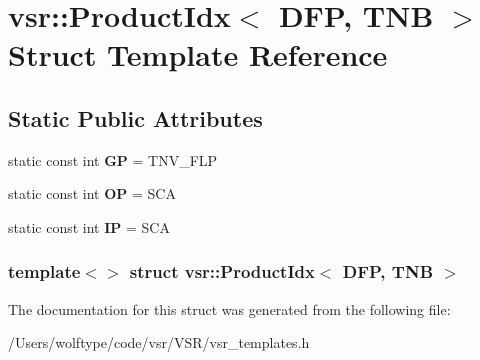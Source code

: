 \hypertarget{structvsr_1_1_product_idx_3_01_d_f_p_00_01_t_n_b_01_4}{\section{vsr\-:\-:Product\-Idx$<$ D\-F\-P, T\-N\-B $>$ Struct Template Reference}
\label{structvsr_1_1_product_idx_3_01_d_f_p_00_01_t_n_b_01_4}
}
\subsection*{Static Public Attributes}
\begin{DoxyCompactItemize}
\item 
\hypertarget{structvsr_1_1_product_idx_3_01_d_f_p_00_01_t_n_b_01_4_ac7a2502bdf69bca21f7c6f2f134d434c}{static const int {\bfseries G\-P} = T\-N\-V\-\_\-\-F\-L\-P}\label{structvsr_1_1_product_idx_3_01_d_f_p_00_01_t_n_b_01_4_ac7a2502bdf69bca21f7c6f2f134d434c}

\item 
\hypertarget{structvsr_1_1_product_idx_3_01_d_f_p_00_01_t_n_b_01_4_ad11d616eee6bfe2f9be04cb69ad43b7e}{static const int {\bfseries O\-P} = S\-C\-A}\label{structvsr_1_1_product_idx_3_01_d_f_p_00_01_t_n_b_01_4_ad11d616eee6bfe2f9be04cb69ad43b7e}

\item 
\hypertarget{structvsr_1_1_product_idx_3_01_d_f_p_00_01_t_n_b_01_4_a2e6db28bd705da7240d9665e5fde5efd}{static const int {\bfseries I\-P} = S\-C\-A}\label{structvsr_1_1_product_idx_3_01_d_f_p_00_01_t_n_b_01_4_a2e6db28bd705da7240d9665e5fde5efd}

\end{DoxyCompactItemize}
\subsubsection*{template$<$$>$ struct vsr\-::\-Product\-Idx$<$ D\-F\-P, T\-N\-B $>$}



The documentation for this struct was generated from the following file\-:\begin{DoxyCompactItemize}
\item 
/\-Users/wolftype/code/vsr/\-V\-S\-R/vsr\-\_\-templates.\-h\end{DoxyCompactItemize}
